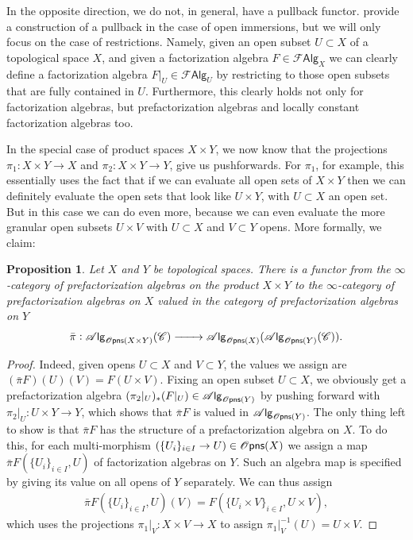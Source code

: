 \documentclass[12pt,a4paper]{article}
\newcounter{counter} \numberwithin{counter}{section}
\theoremstyle{definition}
\theoremstyle{plain}
\newtheorem{proposition}[counter]{Proposition}
\theoremstyle{remark}
\newcommand{\catC}{\mathscr{C}}
\newcommand{\falg}{\mathscr{F} \mathsf{Alg}}
\newcommand{\opens}[1][s]{%
    \ifx r#1\mathsf{Opns}\else
    \ifx s#1\mathscr{O} \mathsf{pns}\else
    \mathrm{Illegal~option}%
    \fi\fi
}
\newcommand{\alg}[1]{\mathscr{A} \mathsf{lg}_{#1}}
\begin{document}
In the opposite direction, we do not, in general, have a pullback functor. \cite{cg2016} provide a construction of a pullback in the case of open immersions, but we will only focus on the case of restrictions. Namely, given an open subset $U \subset X$ of a topological space $X$, and given a factorization algebra $F \in \falg_X$ we can clearly define a factorization algebra $F|_{U} \in \falg_U$ by restricting to those open subsets that are fully contained in $U$. Furthermore, this clearly holds not only for factorization algebras, but prefactorization algebras and locally constant factorization algebras too.

In the special case of product spaces $X \times Y$, we now know that the projections $\pi_1: X \times Y \rightarrow X$ and $\pi_2: X \times Y \rightarrow Y$, give us pushforwards. For $\pi_1$, for example, this essentially uses the fact that if we can evaluate all open sets of $X \times Y$ then we can definitely evaluate the open sets that look like $U \times Y$, with $U \subset X$ an open set. But in this case we can do even more, because we can even evaluate the more granular open subsets $U \times V$ with $U \subset X$ and $V \subset Y$ opens. More formally, we claim:
%
\begin{proposition}\label{prop:exp_of_products}
    Let $X$ and $Y$ be topological spaces. There is a functor from the $\infty$-category of prefactorization algebras on the product $X \times Y$ to the $\infty$-category of prefactorization algebras on $X$ valued in the category of prefactorization algebras on $Y$
    \begin{align}
        \bar{\pi}: \alg{\opens(X \times Y)}(\catC) \xrightarrow{\qquad} \alg{\opens(X)} (\alg{\opens(Y)} (\catC)).
    \end{align}
\end{proposition}

\begin{proof}
    Indeed, given opens $U \subset X$ and $V \subset Y$, the values we assign are $(\bar{\pi}F) (U)(V) = F(U \times V)$. Fixing an open subset $U \subset X$, we obviously get a prefactorization algebra $(\pi_2|_U)_* (F|_U) \in \alg{\opens(Y)}$ by pushing forward with $\pi_2|_U: U \times Y \rightarrow Y$, which shows that $\bar{\pi}F$ is valued in $\alg{\opens(Y)}$. The only thing left to show is that $\bar{\pi} F$ has the structure of a prefactorization algebra on $X$. To do this, for each multi-morphism $(\{ U_i \}_{i \in I} \rightarrow U) \in \opens(X)$ we assign a map $\bar{\pi}F (\{ U_i \}_{i \in I}, U)$ of factorization algebras on $Y$. Such an algebra map is specified by giving its value on all opens of $Y$ separately. We can thus assign
    \begin{align}
        \bar{\pi}F (\{ U_i \}_{i \in I}, U)(V) = F(\{ U_i \times V \}_{i \in I}, U \times V),
    \end{align}
    which uses the projections $\pi_1|_V : X \times V \rightarrow X$ to assign $\pi_1|_V^{-1}(U) = U \times V$.
\end{proof}
\end{document}

